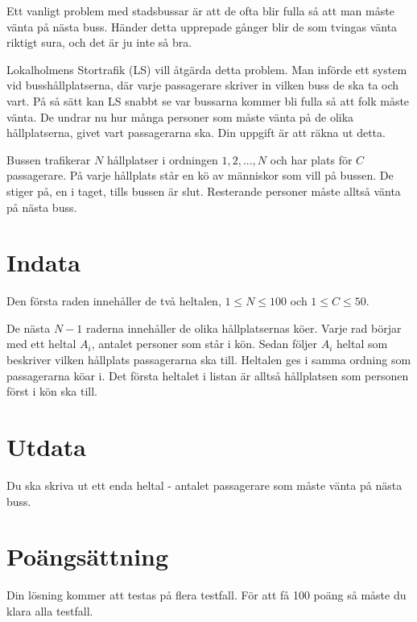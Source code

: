 
Ett vanligt problem med stadsbussar är att de ofta blir fulla så att man måste vänta på nästa buss. Händer detta upprepade gånger blir de som tvingas vänta riktigt sura, och det är ju inte så bra.

Lokalholmens Stortrafik (LS) vill åtgärda detta problem. Man införde ett system vid busshållplatserna, där varje passagerare skriver in vilken buss de ska ta och vart. På så sätt kan LS snabbt se var bussarna kommer bli fulla så att folk måste vänta. De undrar nu hur många personer som måste vänta på de olika hållplatserna, givet vart passagerarna ska. Din uppgift är att räkna ut detta.

Bussen trafikerar $N$ hållplatser i ordningen $1, 2, ..., N$ och har plats för $C$ passagerare. På varje hållplats står en kö av människor som vill på bussen. De stiger på, en i taget, tills bussen är slut. Resterande personer måste alltså vänta på nästa buss.

\section*{Indata}
Den första raden innehåller de två heltalen, $1 \le N \le 100$ och $1 \le C \le 50$.

De nästa $N - 1$ raderna innehåller de olika hållplatsernas köer. Varje rad börjar med ett heltal $A_i$, antalet personer som står i kön. Sedan följer $A_i$ heltal som beskriver vilken hållplats passagerarna ska till. Heltalen ges i samma ordning som passagerarna köar i. Det första heltalet i listan är alltså hållplatsen som personen först i kön ska till.

\section*{Utdata}
Du ska skriva ut ett enda heltal - antalet passagerare som måste vänta på nästa buss.

\section*{Poängsättning}
Din lösning kommer att testas på flera testfall. För att få 100 poäng så måste du klara alla testfall.
